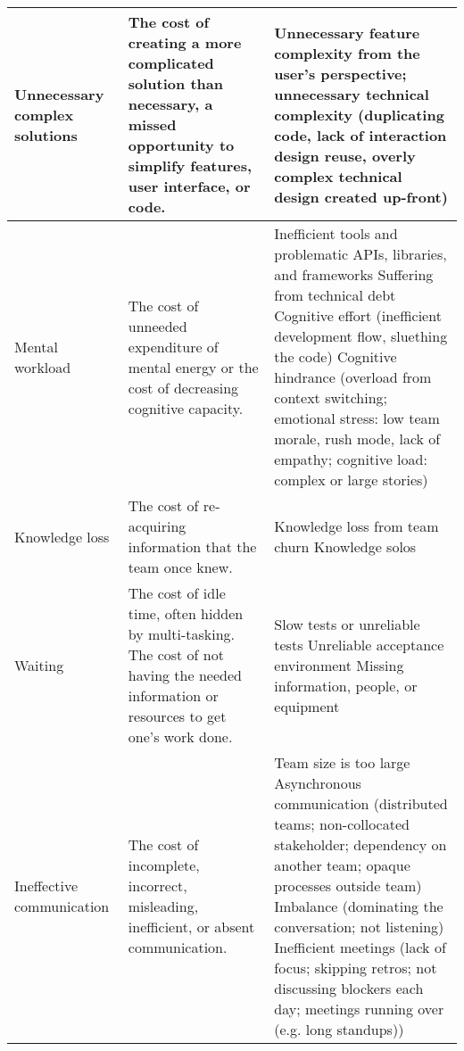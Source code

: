 \begin{table*}[t]
\begin{tabular}{|p{1.7in}|p{1.9in}|p{3in}|}
Unnecessary complex solutions  & The cost of creating a more complicated solution than necessary,  a missed opportunity to simplify features, user interface, or code.      & 
Unnecessary feature complexity from the user's perspective; unnecessary technical complexity (duplicating code, lack of interaction design reuse, overly complex technical design created up-front)
\\ \hline
Mental workload  &   The cost of unneeded expenditure of mental energy or the cost of decreasing cognitive capacity.   & 
Inefficient tools and problematic APIs, libraries, and frameworks \newline
Suffering from technical debt \newline						
Cognitive effort (inefficient development flow, sluething the code) \newline
Cognitive hindrance (overload from context switching; emotional stress: low team morale, rush mode, lack of empathy; cognitive load: complex or large stories)
\\ \hline
Knowledge loss & The cost of re-acquiring information that the team once knew. & 
Knowledge loss from team churn \newline
Knowledge solos 
\\ \hline
Waiting                               & The cost of idle time, often hidden by multi-tasking. The cost of not having the needed information or resources to get one's work done. & 
Slow tests or unreliable tests \newline Unreliable acceptance environment \newline Missing information, people, or equipment                                                                                                                                                                                                                                                                            \\ \hline
Ineffective communication             & The cost of incomplete, incorrect, misleading, inefficient, or absent communication.                         & 
Team size is too large \newline Asynchronous communication (distributed teams; non-collocated stakeholder; dependency on another team; opaque processes outside team) \newline Imbalance (dominating the conversation; not listening) \newline Inefficient meetings (lack of focus; skipping retros; not discussing blockers each day; meetings running over (e.g. long standups)) \\ \hline                  
\end{tabular}
\end{table*}




